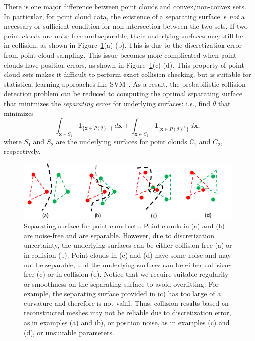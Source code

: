 There is one major difference between point clouds and convex/non-convex sets. In particular, for point cloud data, the existence of a separating surface is \emph{not} a necessary or sufficient condition for non-intersection between the two sets. If two point clouds are noise-free and separable, their underlying surfaces may still be in-collision, as shown in Figure~\ref{fig:7:separating-point}(a)-(b). This is due to the discretization error from point-cloud sampling. This issue becomes more complicated when point clouds have position errors, as shown in Figure~\ref{fig:7:separating-point}(c)-(d).
This property of point cloud sets makes it difficult to perform exact collision checking, but is suitable for statistical learning approaches like SVM~\cite{Bi:2005}. As a result, the probabilistic collision detection problem can be reduced to computing the optimal separating surface that minimizes the \emph{separating error}
for underlying surfaces: i.e., find $\theta$ that minimizes
\begin{equation}
\label{eq:7:error}
\int_{\mathbf x \in S_1} \mathbf{1}_{\{\mathbf x \in P(\theta)^-\}} \ d\mathbf x + \int_{\mathbf x \in S_2} \mathbf{1}_{\{\mathbf x \in P(\theta)^+\}} \ d\mathbf x,
\end{equation}
where $S_1$ and $S_2$ are the underlying surfaces for point clouds $C_1$ and $C_2$, respectively.


\begin{figure}[htb]
  \centering
  \includegraphics[width=0.9\linewidth]{figs/7/separating-point.pdf}
  \caption[Separating surface for point cloud sets]{\label{fig:7:separating-point} Separating surface for point cloud sets. Point clouds in (a) and (b) are noise-free and are separable. However, due to discretization uncertainty, the underlying surfaces can be either
  collision-free (a) or in-collision (b). Point clouds in (c) and (d) have some noise and may not be separable, and the underlying surfaces can be either collision-free (c) or in-collision (d). Notice that we require suitable regularity or smoothness on the separating surface to avoid overfitting. For example, the separating surface provided in (c) has too large of a curvature and therefore is not valid. Thus, collision results based on reconstructed meshes may not be reliable due to discretization error, as in examples (a) and (b), or position noise, as in examples (c) and (d), or unsuitable parameters.}
\end{figure}


